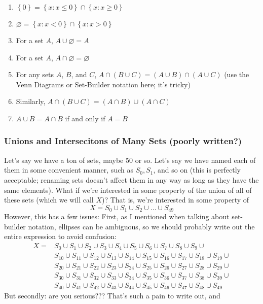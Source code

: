 \documentclass[10pt]{article}
\theoremstyle{definition}
\newcommand{\set}[1]{\left\{ #1 \right\}}
\begin{document}
{\begin{enumerate}
\item $\set{0} = \set{x:x\leq 0}\cap\set{x:x\geq 0}$
\item $\varnothing = \set{x:x<0}\cap\set{x:x>0}$
\item For a set $A$, $A\cup \varnothing = A$
\item For a set $A$, $A\cap \varnothing = \varnothing$
\item For any sets $A$, $B$, and $C$, $A\cap (B\cup C)=(A\cup B)\cap
  (A\cup C)$ (use the Venn Diagrams or Set-Builder notation here; it's
  tricky)
\item Similarly, $A\cap (B\cup C) = (A\cap B)\cup (A\cap C)$
\item $A\cup B = A\cap B$ if and only if $A=B$
\end{enumerate}
\subsubsection{Unions and Intersecitons of Many Sets (poorly written?)}
Let's say we have a ton of sets, maybe 50 or so.  Let's say we have
named each of them in some convenient manner, such as $S_0, S_1$, and
so on (this is perfectly acceptable; renaming sets doesn't affect them
in any way as long as they have the same elements).  What if we're
interested in some property of the union of all of these sets (which
we will call $X$)?  That is, we're interested in some property of
\[X = S_0\cup S_1\cup S_2 \cup \ldots \cup S_{49}\]
However, this has a few issues: First, as I mentioned when talking
about set-builder notation, ellipses can be ambiguous, so we should
probably write out the entire expression to avoid confusion:
\begin{align*}
X =&S_0\cup S_1\cup S_2 \cup S_3 \cup S_4 \cup S_5 \cup S_6 \cup S_7 \cup S_8 \cup S_9 \cup \\
&S_{10}\cup S_{11}\cup S_{12} \cup S_{13} \cup S_{14} \cup S_{15} \cup S_{16} \cup S_{17} \cup S_{18} \cup S_{19} \cup \\
&S_{20}\cup S_{21}\cup S_{22} \cup S_{23} \cup S_{24} \cup S_{25} \cup S_{26} \cup S_{27} \cup S_{28} \cup S_{29} \cup \\
&S_{30}\cup S_{31}\cup S_{32} \cup S_{33} \cup S_{34} \cup S_{35} \cup S_{36} \cup S_{37} \cup S_{38} \cup S_{39} \cup \\
&S_{40}\cup S_{41}\cup S_{42} \cup S_{43} \cup S_{44} \cup S_{45} \cup S_{46} \cup S_{47} \cup S_{48} \cup S_{49}
\end{align*}
But secondly: are you serious??? That's such a pain to write out, and
}
\end{document}
